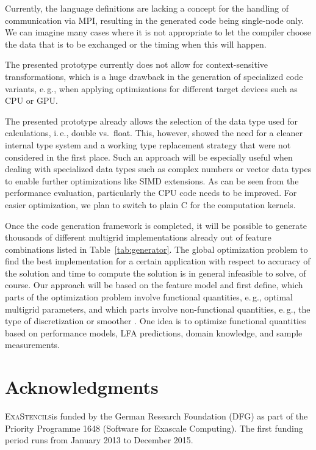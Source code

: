 \documentclass[onecolumn]{svjour3}
\newcommand{\exastencils}{\textsc{ExaStencils}}
\begin{document}
Currently, the language definitions are lacking a concept for the handling of communication via MPI, resulting in the generated code being single-node only.
We can imagine many cases where it is not appropriate to let the compiler choose the data that is to be exchanged or the timing when this will happen.

The presented prototype currently does not allow for context-sensitive transformations, which is a huge drawback in the generation of specialized code variants, e.\,g., when applying optimizations for different target devices such as CPU or GPU.

The presented prototype already allows the selection of the data type used for calculations, i.\,e., double vs.\ float.
This, however, showed the need for a cleaner internal type system and a working type replacement strategy that were not considered in the first place.
Such an approach will be especially useful when dealing with specialized data types such as complex numbers or vector data types to enable further optimizations like SIMD extensions.
As can be seen from the performance evaluation, particularly the CPU code needs to be improved.
For easier optimization, we plan to switch to plain C for the computation kernels.

Once the code generation framework is completed, it will be possible to generate thousands of different multigrid implementations already out of feature combinations listed in Table~\ref{tab:generator}. The global optimization problem to find the best implementation for a certain application with respect to accuracy of the solution and time to compute the solution is in general infeasible to solve, of course. 
Our approach will be based on the feature model and first define, which parts of the optimization problem involve functional quantities, e.\,g., optimal multigrid parameters, and which parts involve non-functional quantities, e.\,g., the type of discretization or smoother \cite{koestlerapelhistencils13}. 
One idea is to optimize functional quantities based on performance models, LFA predictions, domain knowledge, and sample measurements. 





\section{Acknowledgments}

\exastencils is funded by the German Research Foundation (DFG) as part of the Priority Programme 1648 (Software for Exascale Computing). The first funding period runs from January 2013 to December 2015. 
\end{document}
